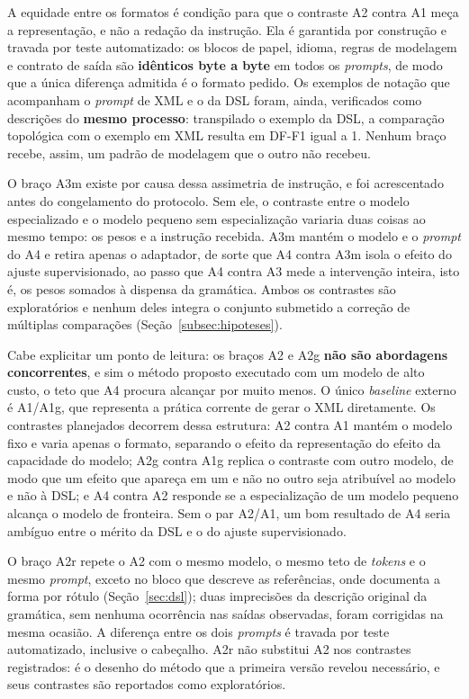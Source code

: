A equidade entre os formatos é condição para que o contraste A2 contra A1 meça a representação, e não a redação da instrução. Ela é garantida por construção e travada por teste automatizado: os blocos de papel, idioma, regras de modelagem e contrato de saída são \textbf{idênticos byte a byte} em todos os \textit{prompts}, de modo que a única diferença admitida é o formato pedido. Os exemplos de notação que acompanham o \textit{prompt} de XML e o da DSL foram, ainda, verificados como descrições do \textbf{mesmo processo}: transpilado o exemplo da DSL, a comparação topológica com o exemplo em XML resulta em DF-F1 igual a 1. Nenhum braço recebe, assim, um padrão de modelagem que o outro não recebeu.

O braço A3m existe por causa dessa assimetria de instrução, e foi acrescentado antes do congelamento do protocolo. Sem ele, o contraste entre o modelo especializado e o modelo pequeno sem especialização variaria duas coisas ao mesmo tempo: os pesos e a instrução recebida. A3m mantém o modelo e o \textit{prompt} do A4 e retira apenas o adaptador, de sorte que A4 contra A3m isola o efeito do ajuste supervisionado, ao passo que A4 contra A3 mede a intervenção inteira, isto é, os pesos somados à dispensa da gramática. Ambos os contrastes são exploratórios e nenhum deles integra o conjunto submetido a correção de múltiplas comparações (Seção~\ref{subsec:hipoteses}).

Cabe explicitar um ponto de leitura: os braços A2 e A2g \textbf{não são abordagens concorrentes}, e sim o método proposto executado com um modelo de alto custo, o teto que A4 procura alcançar por muito menos. O único \textit{baseline} externo é A1/A1g, que representa a prática corrente de gerar o XML diretamente. Os contrastes planejados decorrem dessa estrutura: A2 contra A1 mantém o modelo fixo e varia apenas o formato, separando o efeito da representação do efeito da capacidade do modelo; A2g contra A1g replica o contraste com outro modelo, de modo que um efeito que apareça em um e não no outro seja atribuível ao modelo e não à DSL; e A4 contra A2 responde se a especialização de um modelo pequeno alcança o modelo de fronteira. Sem o par A2/A1, um bom resultado de A4 seria ambíguo entre o mérito da DSL e o do ajuste supervisionado.

O braço A2r repete o A2 com o mesmo modelo, o mesmo teto de \textit{tokens} e o mesmo \textit{prompt}, exceto no bloco que descreve as referências, onde documenta a forma por rótulo (Seção~\ref{sec:dsl}); duas imprecisões da descrição original da gramática, sem nenhuma ocorrência nas saídas observadas, foram corrigidas na mesma ocasião. A diferença entre os dois \textit{prompts} é travada por teste automatizado, inclusive o cabeçalho. A2r não substitui A2 nos contrastes registrados: é o desenho do método que a primeira versão revelou necessário, e seus contrastes são reportados como exploratórios.

